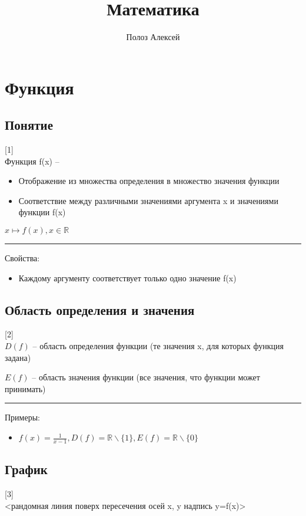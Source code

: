 \documentclass{article}
\title{Математика}
\author{Полоз Алексей}
\begin{document}
\maketitle

\section{Функция}
\label{section:function}
\subsection{Понятие}
[1]\\
Функция f(x) --
\begin{itemize}
    \item Отображение из множества определения в множество значения функции
    \item  Соответствие между различными значениями аргумента x и значениями функции f(x)
\end{itemize}

$x \mapsto f(x), x \in \mathbb{R}$ 


\noindent\rule{\textwidth}{1pt}

Свойства:
\begin{itemize}
    \item Каждому аргументу соответствует только одно значение f(x)
\end{itemize}


\subsection{Область определения и значения}
[2]\\
$D(f)$ -- область определения функции (те значения x, для которых функция задана)

$E(f)$ -- область значения функции (все значения, что функции может принимать)

\noindent\rule{\textwidth}{1pt}

Примеры:
\begin{itemize}
    \item $f(x)=\frac{1}{x-1}, D(f)=\mathbb{R}\backslash\{1\}, E(f)=\mathbb{R}\backslash\{0\}$
\end{itemize}


\subsection{График}
[3]\\
<рандомная линия поверх пересечения осей x, y надпись y=f(x)>
\end{document}
